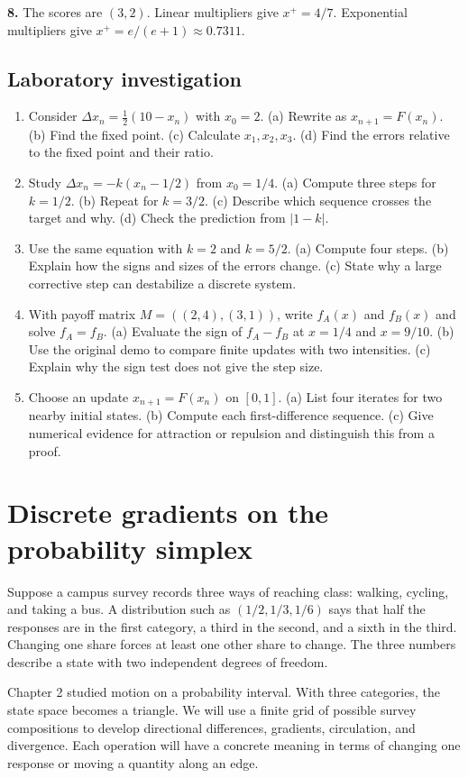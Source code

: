\documentclass[11pt,oneside,openany]{book}
\theoremstyle{definition}
\theoremstyle{remark}
\numberwithin{equation}{chapter}
\providecommand{\tightlist}{\setlength{\itemsep}{0pt}\setlength{\parskip}{0pt}}
\newcommand{\labheading}{\FloatBarrier\section*{Laboratory investigation}\addcontentsline{toc}{section}{Laboratory investigation}}
\begin{document}
\textbf{8.} The scores are \((3,2)\). Linear multipliers give \(x^+=4/7\). Exponential multipliers give \(x^+=e/(e+1)\approx0.7311\).
\labheading\begin{enumerate}
\def\labelenumi{\arabic{enumi}.}
\tightlist
\item
  Consider \(\Delta x_n=\tfrac12(10-x_n)\) with \(x_0=2\). (a) Rewrite as \(x_{n+1}=F(x_n)\). (b) Find the fixed point. (c) Calculate \(x_1,x_2,x_3\). (d) Find the errors relative to the fixed point and their ratio.
\item
  Study \(\Delta x_n=-k(x_n-1/2)\) from \(x_0=1/4\). (a) Compute three steps for \(k=1/2\). (b) Repeat for \(k=3/2\). (c) Describe which sequence crosses the target and why. (d) Check the prediction from \(|1-k|\).
\item
  Use the same equation with \(k=2\) and \(k=5/2\). (a) Compute four steps. (b) Explain how the signs and sizes of the errors change. (c) State why a large corrective step can destabilize a discrete system.
\item
  With payoff matrix \(M=((2,4),(3,1))\), write \(f_A(x)\) and \(f_B(x)\) and solve \(f_A=f_B\). (a) Evaluate the sign of \(f_A-f_B\) at \(x=1/4\) and \(x=9/10\). (b) Use the original demo to compare finite updates with two intensities. (c) Explain why the sign test does not give the step size.
\item
  Choose an update \(x_{n+1}=F(x_n)\) on \([0,1]\). (a) List four iterates for two nearby initial states. (b) Compute each first-difference sequence. (c) Give numerical evidence for attraction or repulsion and distinguish this from a proof.
\end{enumerate}

\FloatBarrier

\chapter{Discrete gradients on the probability simplex}
Suppose a campus survey records three ways of reaching class: walking, cycling, and taking a bus. A distribution such as \((1/2,1/3,1/6)\) says that half the responses are in the first category, a third in the second, and a sixth in the third. Changing one share forces at least one other share to change. The three numbers describe a state with two independent degrees of freedom.

Chapter 2 studied motion on a probability interval. With three categories, the state space becomes a triangle. We will use a finite grid of possible survey compositions to develop directional differences, gradients, circulation, and divergence. Each operation will have a concrete meaning in terms of changing one response or moving a quantity along an edge.
\end{document}
